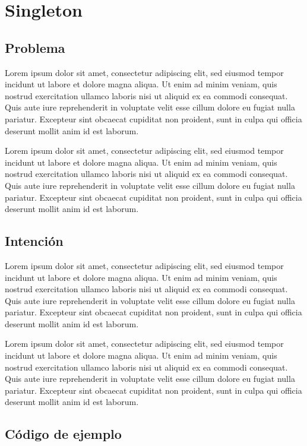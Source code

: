 \documentclass[12pt]{book}
\begin{document}
\section{Singleton}

\subsection{Problema}

Lorem ipsum dolor sit amet, consectetur adipiscing elit, sed eiusmod tempor incidunt ut labore et dolore magna aliqua. Ut enim ad minim veniam, quis nostrud exercitation ullamco laboris nisi ut aliquid ex ea commodi consequat. Quis aute iure reprehenderit in voluptate velit esse cillum dolore eu fugiat nulla pariatur. Excepteur sint obcaecat cupiditat non proident, sunt in culpa qui officia deserunt mollit anim id est laborum.

Lorem ipsum dolor sit amet, consectetur adipiscing elit, sed eiusmod tempor incidunt ut labore et dolore magna aliqua. Ut enim ad minim veniam, quis nostrud exercitation ullamco laboris nisi ut aliquid ex ea commodi consequat. Quis aute iure reprehenderit in voluptate velit esse cillum dolore eu fugiat nulla pariatur. Excepteur sint obcaecat cupiditat non proident, sunt in culpa qui officia deserunt mollit anim id est laborum.

\subsection{Intención}

Lorem ipsum dolor sit amet, consectetur adipiscing elit, sed eiusmod tempor incidunt ut labore et dolore magna aliqua. Ut enim ad minim veniam, quis nostrud exercitation ullamco laboris nisi ut aliquid ex ea commodi consequat. Quis aute iure reprehenderit in voluptate velit esse cillum dolore eu fugiat nulla pariatur. Excepteur sint obcaecat cupiditat non proident, sunt in culpa qui officia deserunt mollit anim id est laborum.

Lorem ipsum dolor sit amet, consectetur adipiscing elit, sed eiusmod tempor incidunt ut labore et dolore magna aliqua. Ut enim ad minim veniam, quis nostrud exercitation ullamco laboris nisi ut aliquid ex ea commodi consequat. Quis aute iure reprehenderit in voluptate velit esse cillum dolore eu fugiat nulla pariatur. Excepteur sint obcaecat cupiditat non proident, sunt in culpa qui officia deserunt mollit anim id est laborum.

\newpage
\subsection{Código de ejemplo}
\end{document}
